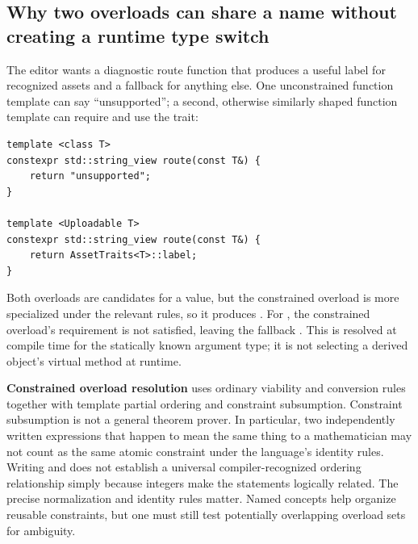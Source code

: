 \subsection{Why two overloads can share a name without creating a runtime type switch}\label{01-foundations-i-ch005-why-two-overloads-can-share-a-name-without-creating-a-runtime-type-switch}

\hypertarget{01-foundations-i-ch005-why-two-overloads-can-share-a-name-without-creating-a-runtime-type-switch}{}

The editor wants a diagnostic route function that produces a useful label for recognized assets and a fallback for anything else. One unconstrained function template can say ``unsupported''; a second, otherwise similarly shaped function template can require  and use the trait:

\begin{verbatim}
template <class T>
constexpr std::string_view route(const T&) {
    return "unsupported";
}

template <Uploadable T>
constexpr std::string_view route(const T&) {
    return AssetTraits<T>::label;
}
\end{verbatim}

Both overloads are candidates for a  value, but the constrained overload is more specialized under the relevant rules, so it produces . For , the constrained overload's requirement is not satisfied, leaving the fallback . This is resolved at compile time for the statically known argument type; it is not selecting a derived object's virtual method at runtime.

\textbf{Constrained overload resolution} uses ordinary viability and conversion rules together with template partial ordering and constraint subsumption. Constraint subsumption is not a general theorem prover. In particular, two independently written expressions that happen to mean the same thing to a mathematician may not count as the same atomic constraint under the language's identity rules. Writing  and  does not establish a universal compiler-recognized ordering relationship simply because integers make the statements logically related. The precise normalization and identity rules matter. Named concepts help organize reusable constraints, but one must still test potentially overlapping overload sets for ambiguity.

